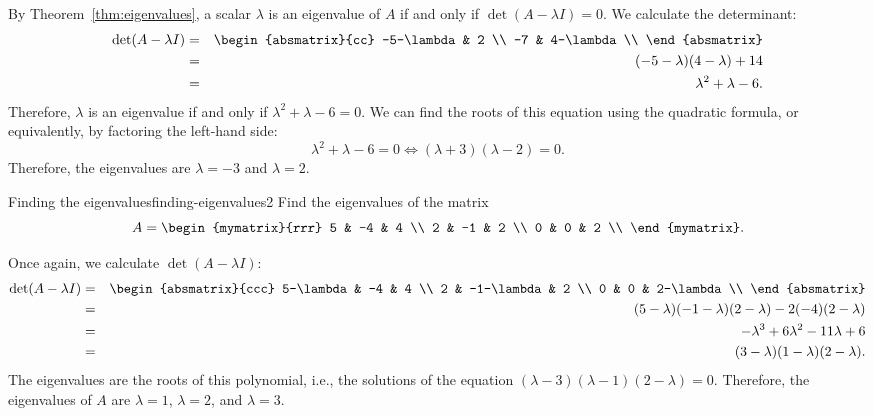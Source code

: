 \begin{solution}
  By Theorem~\ref{thm:eigenvalues}, a scalar $\lambda$ is an
  eigenvalue of $A$ if and only if $\det(A-\lambda I)=0$. We calculate
  the determinant:
  \begin{eqnarray*}
    \det(A-\lambda I)
    &=&
    \begin{absmatrix}{cc}
      -5-\lambda & 2 \\
      -7 & 4-\lambda \\
    \end{absmatrix} \\
    &=& (-5-\lambda)(4-\lambda) + 14 \\
    &=& \lambda^2 + \lambda - 6.
  \end{eqnarray*}
  Therefore, $\lambda$ is an eigenvalue if and only if
  $\lambda^2 + \lambda - 6 = 0$. We can find the roots of this
  equation using the quadratic formula, or equivalently, by factoring
  the left-hand side:
  \begin{equation*}
    \lambda^2 + \lambda - 6 = 0
    \iff
    (\lambda+3)(\lambda-2) = 0.
  \end{equation*}
  Therefore, the eigenvalues are $\lambda=-3$ and $\lambda=2$.
\end{solution}

\begin{example}{Finding the eigenvalues}{finding-eigenvalues2}
  Find the eigenvalues of the matrix
  \begin{equation*}
    A=\begin{mymatrix}{rrr}
      5 & -4 & 4 \\
      2 & -1 & 2 \\
      0 &  0 & 2 \\
    \end{mymatrix}.
  \end{equation*}
\end{example}

\begin{solution}
  Once again, we calculate $\det(A-\lambda I)$:
  \begin{eqnarray*}
    \det(A-\lambda I)
    &=&
        \begin{absmatrix}{ccc}
          5-\lambda & -4 & 4 \\
          2 & -1-\lambda & 2 \\
          0 &  0 & 2-\lambda \\
        \end{absmatrix} \\
    &=&
        (5-\lambda)(-1-\lambda)(2-\lambda) - 2(-4)(2-\lambda) \\
    &=& -\lambda^3 + 6\lambda^2 - 11\lambda + 6 \\
    &=& (3-\lambda)(1-\lambda)(2-\lambda).
  \end{eqnarray*}
  The eigenvalues are the roots of this polynomial, i.e., the
  solutions of the equation
  $(\lambda-3)(\lambda-1)(2-\lambda)=0$. Therefore, the eigenvalues of
  $A$ are $\lambda=1$, $\lambda=2$, and $\lambda=3$.
\end{solution}

